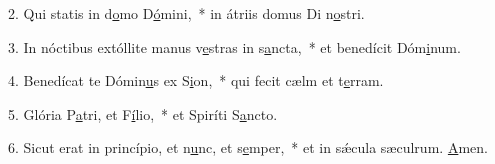 2. Qui statis in d\uline{o}mo D\uline{ó}mini,~* in átriis domus Di n\uline{o}stri.\par 
3. In nóctibus extóllite manus v\uline{e}stras in s\uline{a}ncta,~* et benedícit Dóm\uline{i}num.\par 
4. Benedícat te Dómin\uline{u}s ex S\uline{i}on,~* qui fecit cælm et t\uline{e}rram.\par 
5. Glória P\uline{a}tri, et F\uline{í}lio,~* et Spiríti S\uline{a}ncto.\par 
6. Sicut erat in princípio, et n\uline{u}nc, et s\uline{e}mper,~* et in sǽcula sæculrum. \uline{A}men.\par 
